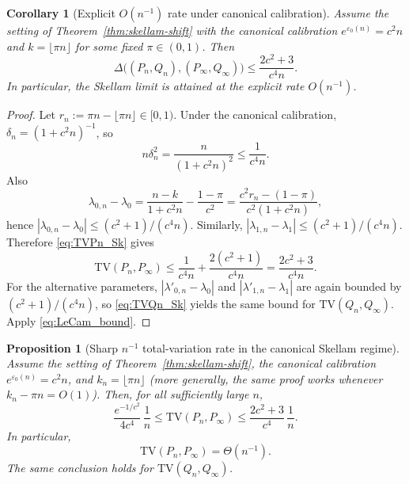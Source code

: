 \documentclass{article}
\newtheorem{proposition}[theorem]{Proposition}
\newtheorem{corollary}[theorem]{Corollary}
\begin{document}
\begin{corollary}[Explicit $O(n^{-1})$ rate under canonical calibration]
\label{cor:skellam-explicit-rate}
Assume the setting of Theorem~\ref{thm:skellam-shift} with the canonical calibration $e^{\varepsilon_0(n)} = c^2 n$ and $k = \lfloor\pi n\rfloor$ for some fixed $\pi \in (0,1)$. Then
\[
\Delta\bigl((P_n, Q_n), (P_\infty, Q_\infty)\bigr) \leq \frac{2c^2 + 3}{c^4 n}.
\]
In particular, the Skellam limit is attained at the explicit rate $O(n^{-1})$.
\end{corollary}

\begin{proof}
Let $r_n := \pi n - \lfloor\pi n\rfloor \in [0,1)$. Under the canonical calibration, $\delta_n = (1 + c^2 n)^{-1}$, so
\[
n\delta_n^2 = \frac{n}{(1 + c^2 n)^2} \leq \frac{1}{c^4 n}.
\]
Also
\[
\lambda_{0,n} - \lambda_0 = \frac{n - k}{1 + c^2 n} - \frac{1 - \pi}{c^2} = \frac{c^2 r_n - (1-\pi)}{c^2(1 + c^2 n)},
\]
hence $|\lambda_{0,n} - \lambda_0| \leq (c^2 + 1)/(c^4 n)$. Similarly, $|\lambda_{1,n} - \lambda_1| \leq (c^2 + 1)/(c^4 n)$. Therefore \eqref{eq:TVPn_Sk} gives
\[
\mathrm{TV}(P_n, P_\infty) \leq \frac{1}{c^4 n} + \frac{2(c^2 + 1)}{c^4 n} = \frac{2c^2 + 3}{c^4 n}.
\]
For the alternative parameters, $|\lambda'_{0,n} - \lambda_0|$ and $|\lambda'_{1,n} - \lambda_1|$ are again bounded by $(c^2+1)/(c^4 n)$, so \eqref{eq:TVQn_Sk} yields
the same bound for $\mathrm{TV}(Q_n, Q_\infty)$. Apply \eqref{eq:LeCam_bound}.
\end{proof}

\begin{proposition}[Sharp $n^{-1}$ total-variation rate in the canonical Skellam regime]
\label{prop:skellam-tv-rate}
Assume the setting of Theorem~\ref{thm:skellam-shift}, the canonical calibration $e^{\varepsilon_0(n)}=c^2 n$, and
$k_n=\lfloor \pi n\rfloor$ (more generally, the same proof works whenever $k_n-\pi n=O(1)$). Then,
for all sufficiently large $n$,
\[
\frac{e^{-1/c^2}}{4c^4}\,\frac1n
\le \mathrm{TV}(P_n,P_\infty)
\le \frac{2c^2+3}{c^4}\,\frac1n.
\]
In particular,
\[
\mathrm{TV}(P_n,P_\infty)=\Theta(n^{-1}).
\]
The same conclusion holds for $\mathrm{TV}(Q_n,Q_\infty)$.
\end{proposition}
\end{document}
